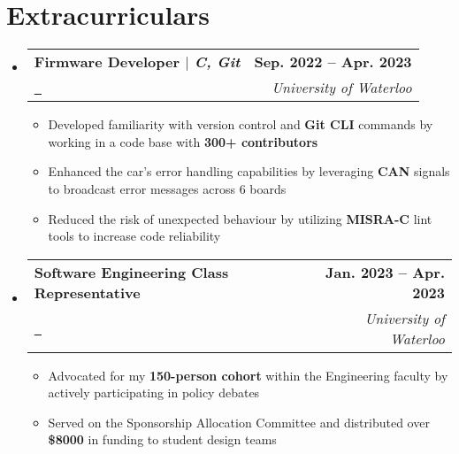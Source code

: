\documentclass[letterpaper,11pt]{article}
\makeatletter
\newcommand{\resumeItem}[1]{
  \item\small{
    {#1 \vspace{-2pt}}
  }
}
\newcommand{\resumeSubheading}[4]{
  \vspace{-2pt}\item
    \begin{tabular*}{1.0\textwidth}[t]{l@{\extracolsep{\fill}}r}
      \textbf{#1} & \textbf{\small #2} \\
      \textit{\small#3} & \textit{\small #4} \\
    \end{tabular*}\vspace{-7pt}
}
\newcommand{\resumeSubHeadingListStart}{\begin{itemize}[leftmargin=0.0in, label={}]}
\newcommand{\resumeSubHeadingListEnd}{\end{itemize}}
\newcommand{\resumeItemListStart}{\begin{itemize}}
\newcommand{\resumeItemListEnd}{\end{itemize}\vspace{-5pt}}
\newcommand{\brokenUL}[1]{%
  \uline{\phantom{#1}}%
  \llap{\contour{white}{#1}}%
}
\makeatother
\begin{document}
\section{Extracurriculars}
    \resumeSubHeadingListStart
        \resumeSubheading
        {Firmware Developer $|$ \textnormal{\normalem\emph{C, Git}}}
        {Sep. 2022 -- Apr. 2023}
        {\href{https://waterlooformulaelectric.com}{\raisebox{-0.2\height}\faExternalLink\ \brokenUL{Formula Electric Design Team}}}
        {University of Waterloo}
            \resumeItemListStart
                \resumeItem{Developed familiarity with version control and \textbf{Git CLI} commands by working in a code base with \textbf{300+ contributors}}
                \resumeItem{Enhanced the car's error handling capabilities by leveraging \textbf{CAN} signals to broadcast error messages across 6 boards}
                \resumeItem{Reduced the risk of unexpected behaviour by utilizing \textbf{MISRA-C} lint tools to increase code reliability}
            \resumeItemListEnd
        \resumeSubheading
        {Software Engineering Class Representative}
        {Jan. 2023 -- Apr. 2023}
        {\href{https://www.engsoc.uwaterloo.ca}{\raisebox{-0.2\height}\faExternalLink\ \brokenUL{Engineering Society}}}
        {University of Waterloo}
            \resumeItemListStart
                \resumeItem{Advocated for my \textbf{150-person cohort} within the Engineering faculty by actively participating in policy debates}
                \resumeItem{Served on the Sponsorship Allocation Committee and distributed over \textbf{\$8000} in funding to student design teams}
            \resumeItemListEnd
    \resumeSubHeadingListEnd
\end{document}
